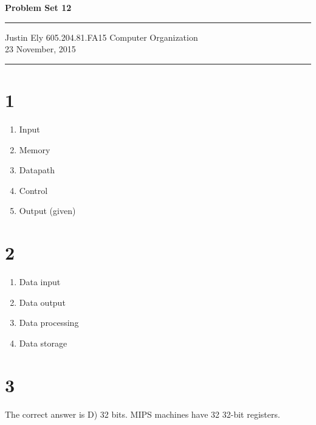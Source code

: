 \documentclass[a4paper,11pt]{article}
\begin{document}
\begin{flushright}

\vspace{1.1cm}

{\bf\Huge Problem Set 12}

\rule{0.25\linewidth}{0.5pt}

\vspace{0.5cm}
Justin Ely
\linebreak
\newline
\footnotesize{605.204.81.FA15 Computer Organization\\}
\vspace{0.5cm}
23 November, 2015
\end{flushright}

\noindent\rule{\linewidth}{1.0pt}



\section*{1}

\begin{enumerate}
    \item Input
    \item Memory
    \item Datapath
    \item Control
    \item Output (given)
\end{enumerate}


\section*{2}
\begin{enumerate}
    \item Data input
    \item Data output
    \item Data processing
    \item Data storage
\end{enumerate}



\section*{3}
The correct answer is D) 32 bits.  MIPS machines have 32 32-bit registers.
\end{document}
